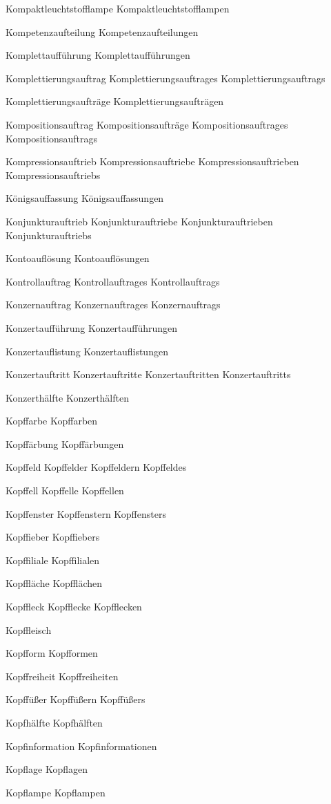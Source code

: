 Kompaktleuchtstofflampe
Kompaktleuchtstofflampen

Kompetenzaufteilung
Kompetenzaufteilungen

Komplettaufführung
Komplettaufführungen

Komplettierungsauftrag
Komplettierungsauftrages
Komplettierungsauftrags

Komplettierungsaufträge
Komplettierungsaufträgen

Kompositionsauftrag
Kompositionsaufträge
Kompositionsauftrages
Kompositionsauftrags

Kompressionsauftrieb
Kompressionsauftriebe
Kompressionsauftrieben
Kompressionsauftriebs

Königsauffassung
Königsauffassungen

Konjunkturauftrieb
Konjunkturauftriebe
Konjunkturauftrieben
Konjunkturauftriebs

Kontoauflösung
Kontoauflösungen

Kontrollauftrag
Kontrollauftrages
Kontrollauftrags

Konzernauftrag
Konzernauftrages
Konzernauftrags

Konzertaufführung
Konzertaufführungen

Konzertauflistung
Konzertauflistungen

Konzertauftritt
Konzertauftritte
Konzertauftritten
Konzertauftritts

Konzerthälfte
Konzerthälften

Kopffarbe
Kopffarben

Kopffärbung
Kopffärbungen

Kopffeld
Kopffelder
Kopffeldern
Kopffeldes

Kopffell
Kopffelle
Kopffellen

Kopffenster
Kopffenstern
Kopffensters

Kopffieber
Kopffiebers

Kopffiliale
Kopffilialen

Kopffläche
Kopfflächen

Kopffleck
Kopfflecke
Kopfflecken

Kopffleisch

Kopfform
Kopfformen

Kopffreiheit
Kopffreiheiten

Kopffüßer
Kopffüßern
Kopffüßers

Kopfhälfte
Kopfhälften

Kopfinformation
Kopfinformationen

Kopflage
Kopflagen

Kopflampe
Kopflampen

